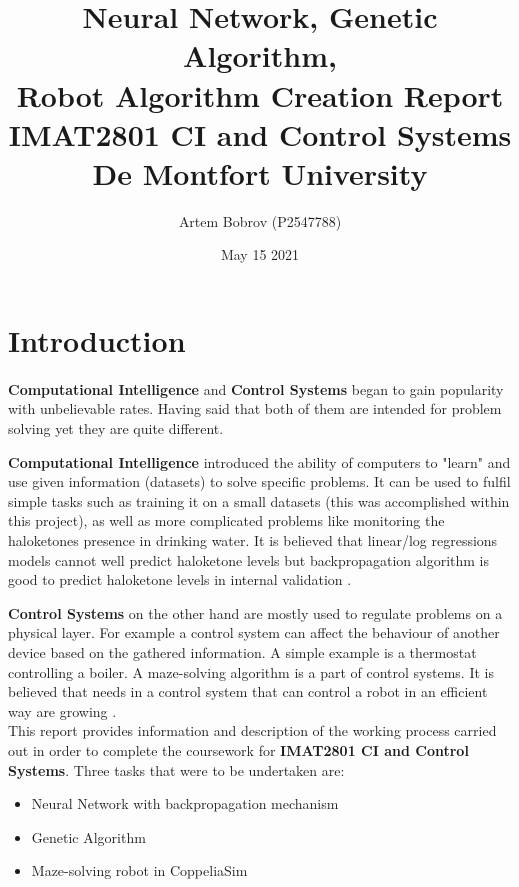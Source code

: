 \documentclass[12pt]{report}
\title{%
  Neural Network, Genetic Algorithm,\\
  Robot Algorithm Creation Report\\
  \large IMAT2801 CI and Control Systems \\
    De Montfort University}
\author{Artem Bobrov (P2547788)}
\date{May 15 2021}
\begin{document}
\maketitle
\thispagestyle{empty}
\clearpage
\tableofcontents
\setcounter{tocdepth}{1}
\thispagestyle{empty}
\clearpage
\section*{Introduction}

\paragraph{}

\textbf{Computational Intelligence} and \textbf{Control Systems} began to gain popularity with unbelievable rates. Having said that both of them are intended for problem solving yet they are quite different. 

\textbf{Computational Intelligence} introduced the ability of computers to "learn" and use given information (datasets) to solve specific problems. It can be used to fulfil simple tasks such as training it on a small datasets
(this was accomplished within this project), as well as more complicated problems like monitoring the haloketones presence in drinking water. It is believed that linear/log regressions models cannot well predict haloketone levels
but backpropagation algorithm is good to predict haloketone levels in internal validation \citep{BPArticle1}. %

\textbf{Control Systems} on the other hand are mostly used to regulate problems on a physical layer. For example a control system can affect the behaviour of another device based on the gathered information.
A simple example is a thermostat controlling a boiler. A maze-solving algorithm is a part of control systems. It is believed that needs in a control system that can control a robot in an efficient way are growing \citep{RobotArticle1}. %
\\

This report provides information and description of the working process carried out in order to complete the coursework for \textbf{IMAT2801 CI and Control Systems}. Three tasks that were to be undertaken are:
\begin{itemize}
  \item Neural Network with backpropagation mechanism 
  \item Genetic Algorithm
  \item Maze-solving robot in CoppeliaSim
\end{itemize}
\end{document}
